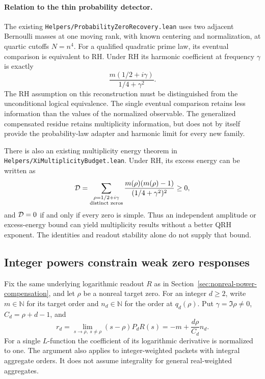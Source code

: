 \paragraph{Relation to the thin probability detector.}
The existing \texttt{Helpers/ProbabilityZeroRecovery.lean} uses two
adjacent Bernoulli masses at one moving rank, with known centering
and normalization, at quartic cutoffs \(N=n^4\).
For a qualified quadratic prime law, its eventual comparison is
equivalent to RH. Under RH its harmonic coefficient at frequency
\(\gamma\) is exactly
\[
 \frac{m(1/2+i\gamma)}{1/4+\gamma^2}.
\]
The RH assumption on this reconstruction must be distinguished
from the unconditional logical equivalence.
The single eventual comparison retains less information than the
values of the normalized observable. The generalized compensated
residue retains multiplicity information, but does not by itself
provide the probability-law adapter and harmonic limit for every
new family.

There is also an existing multiplicity energy theorem in
\texttt{Helpers/XiMultiplicityBudget.lean}. Under RH, its excess
energy can be written as
\[
 {\cal D}=
 \sum_{\substack{\rho=1/2+i\gamma\\\text{distinct zeros}}}
 \frac{m(\rho)(m(\rho)-1)}{(1/4+\gamma^2)^2}\ge0,
\]
and \({\cal D}=0\) if and only if every zero is simple.
Thus an independent amplitude or excess-energy bound can yield
multiplicity results without a better QRH exponent. The identities
and readout stability alone do not supply that bound.

\subsection{Integer powers constrain weak zero responses}
\label{sec:integer-power-multiplicity}

Fix the same underlying logarithmic readout \(R\) as in
Section~\ref{sec:nonreal-power-compensation}, and let \(\rho\) be a nonreal
target zero. For an integer \(d\ge2\), write \(m\in\mathbb N\) for its
target order and \(n_d\in\mathbb N\) for the order at \(q_d(\rho)\).
Put \(\gamma=\Im\rho\ne0\), \(C_d=\rho+d-1\), and
\[
 r_d=\lim_{s\to\rho,\ s\ne\rho}(s-\rho)P_dR(s)
       =-m+\frac{d\rho}{C_d}n_d.
\]
For a single \(L\)-function the coefficient of its logarithmic derivative
is normalized to one. The argument also applies to integer-weighted
packets with integral aggregate orders. It does not assume integrality
for general real-weighted aggregates.

